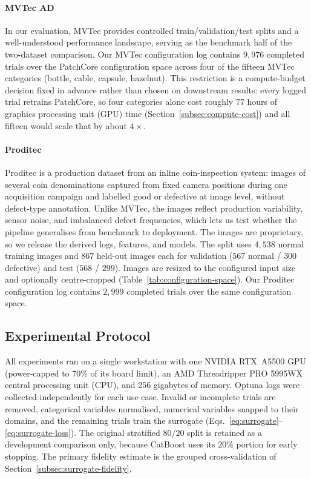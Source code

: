 \documentclass[final,5p,times,twocolumn]{elsarticle}
\begin{document}
\paragraph{MVTec AD}
In our evaluation, MVTec \cite{bergmann_mvtec_2019} provides controlled
train/validation/test splits and a well-understood performance
landscape, serving as the benchmark half of the two-dataset comparison.
Our MVTec configuration log contains $9{,}976$ completed trials over
the PatchCore configuration space across four of the fifteen MVTec
categories (bottle, cable, capsule, hazelnut). This restriction is a compute-budget decision fixed in advance rather
than chosen on downstream results: every logged trial retrains
PatchCore, so four categories alone cost roughly $77$ hours of graphics
processing unit (GPU) time
(Section~\ref{subsec:compute-cost}) and all fifteen would scale that
by about $4\times$.

\paragraph{Proditec}
Proditec is a production dataset from an inline coin-inspection system:
images of several coin denominations captured from fixed camera
positions during one acquisition campaign and labelled good or
defective at image level, without defect-type annotation. Unlike MVTec,
the images reflect production variability, sensor noise, and imbalanced
defect frequencies, which lets us test whether the pipeline generalises
from benchmark to deployment. The images are proprietary, so we release
the derived logs, features, and models. The split uses $4{,}538$ normal
training images and $867$ held-out images each for validation ($567$
normal / $300$ defective) and test ($568$ / $299$). Images are resized
to the configured input size and optionally centre-cropped
(Table~\ref{tab:configuration-space}). Our Proditec configuration log
contains $2{,}999$ completed trials over the same configuration space.



\subsection{Experimental Protocol}
\label{subsec:protocol}

All experiments ran on a single workstation with one NVIDIA RTX~A5500
GPU (power-capped to 70\% of its board limit), an AMD Threadripper PRO
5995WX central processing unit (CPU), and 256 gigabytes of memory. Optuna logs were collected independently for each use case. Invalid or incomplete trials are removed, categorical variables normalised,
numerical variables snapped to their domains, and the remaining trials
train the surrogate (Eqs.~\ref{eq:surrogate}--\ref{eq:surrogate-loss}).
The original stratified $80/20$ split is retained as a development
comparison only, because CatBoost uses its $20\%$ portion for early stopping. The primary fidelity estimate is the grouped cross-validation
of Section~\ref{subsec:surrogate-fidelity}.
\end{document}
